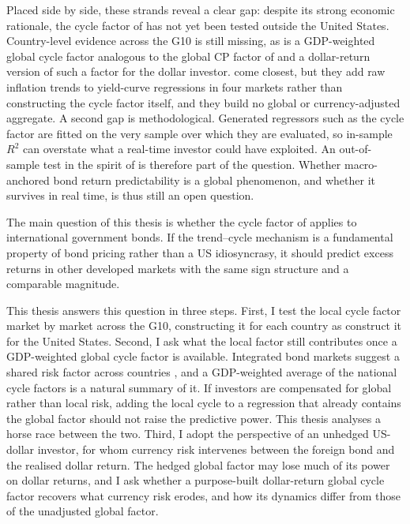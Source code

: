 Placed side by side, these strands reveal a clear gap: despite its strong
economic rationale, the cycle factor of \citet{cieslak2015} has not yet been
tested outside the United States. Country-level evidence across the G10 is
still missing, as is a GDP-weighted global cycle factor analogous to the
global CP factor of \citet{dahlquist2013} and a dollar-return version of such
a factor for the dollar investor. \citet{zhang2021} come closest, but they add
raw inflation trends to yield-curve regressions in four markets rather than
constructing the cycle factor itself, and they build no global or
currency-adjusted aggregate. A second gap is methodological. Generated
regressors such as the cycle factor are fitted on the very sample over which
they are evaluated, so in-sample $R^{2}$ can overstate what a
real-time investor could have exploited. An out-of-sample test in the spirit of
\citet{campbellthompson2008} is therefore part of the question. 
Whether macro-anchored bond return
predictability is a global phenomenon, and whether it survives in real time,
is thus still an open question.


The main question of this thesis is whether the cycle factor of
\citet{cieslak2015} applies to international government bonds. If the
trend--cycle mechanism is a fundamental property of bond pricing rather than a
US idiosyncrasy, it should predict excess returns in other developed markets
with the same sign structure and a comparable magnitude.

This thesis answers this question in three steps. First, I test the local cycle factor
market by market across the G10, constructing it for each country as
\citet{cieslak2015} construct it for the United States. Second, I ask what
the local factor still contributes once a GDP-weighted global cycle factor is
available. Integrated bond markets suggest a shared risk factor across
countries \citep{dahlquist2013}, and a GDP-weighted average of the national
cycle factors is a natural summary of it. If investors are compensated for
global rather than local risk, adding the local cycle to a regression that
already contains the global factor should not raise the predictive power. This thesis analyses a horse race between the two. Third, I adopt the perspective of an
unhedged US-dollar investor, for whom currency risk intervenes between the
foreign bond and the realised dollar return. The hedged global factor may lose
much of its power on dollar returns, and I ask whether a purpose-built
dollar-return global cycle factor recovers what currency risk erodes,
and how its dynamics differ from those of the unadjusted global factor.

